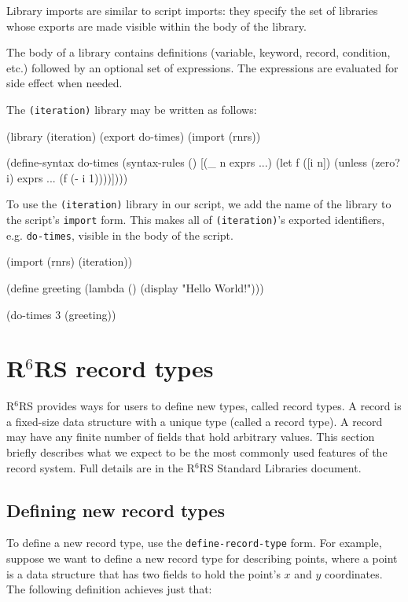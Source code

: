 \documentclass[onecolumn, 12pt, twoside, openright, dvipdfm]{book}
\newcommand{\rnrs}[1]{R$^{\mathrm{#1}}$RS}
\begin{document}
Library imports are similar to script imports: they specify the set
of libraries whose exports are made visible within the body of the
library.  

The body of a library contains definitions (variable, keyword,
record, condition, etc.) followed by an optional set of expressions.
The expressions are evaluated for side effect when needed.


The \texttt{(iteration)} library may be written as follows:

\begin{CodeInline}
(library (iteration)
  (export do-times)
  (import (rnrs))

  (define-syntax do-times
    (syntax-rules ()
      [(_ n exprs ...)
       (let f ([i n])
         (unless (zero? i)
           exprs ...
           (f (- i 1))))])))
\end{CodeInline}

To use the \texttt{(iteration)} library in our script, we add the
name of the library to the script's \texttt{import} form.  This
makes all of \texttt{(iteration)}'s exported identifiers, e.g.
\texttt{do-times},  visible in the body of the script.

\begin{CodeInline}
(import (rnrs) (iteration))

(define greeting
  (lambda ()
    (display "Hello World!\n")))

(do-times 3 (greeting))
\end{CodeInline}

\section{\rnrs{6} record types}

\rnrs{6} provides ways for users to define new types, called record
types.  A record is a fixed-size data structure with a unique type
(called a record type).  A record may have any finite number of
fields that hold arbitrary values.  This section briefly describes
what we expect to be the most commonly used features of the record
system.  Full details are in the \rnrs{6} Standard Libraries
document\cite{r6rs:lib}.

\subsection{Defining new record types}

To define a new record type,  use the \texttt{define-record-type}
form.  For example, suppose we want to define a new record type for
describing points, where a point is a data structure that has two
fields to hold the point's $x$ and $y$ coordinates.  The following
definition achieves just that:
\end{document}

